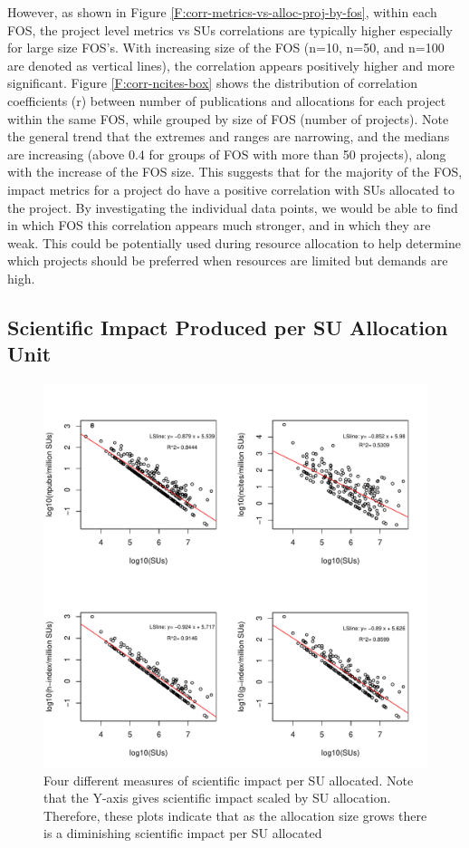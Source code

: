 \documentclass{sig-alternate}
\begin{document}
However, as shown in Figure \ref{F:corr-metrics-vs-alloc-proj-by-fos}, within each FOS, the project level metrics vs SUs correlations are typically higher especially for large size FOS's. With increasing size of the FOS (n=10, n=50, and n=100 are denoted as vertical lines), the correlation appears positively higher and more significant. Figure \ref{F:corr-ncites-box} shows the distribution of correlation coefficients (r) between number of publications and allocations for each project within the same FOS, while grouped by size of FOS (number of projects). Note the general trend that the extremes and ranges are narrowing, and the medians are increasing (above 0.4 for groups of FOS with more than 50 projects), along with the increase of the FOS size. This suggests that for the majority of the FOS, impact metrics for a project do have a positive correlation with SUs allocated to the project. By investigating the individual data points, we would be able to find in which FOS this correlation appears much stronger, and in which they are weak. This could be potentially used during resource allocation to help determine which projects should be preferred when resources are limited but demands are high.

\subsection{Scientific Impact Produced per SU Allocation Unit} 

\begin{figure}[!htb] 
  \centering 
    \includegraphics[width=1.0\columnwidth]{images/09_roi_projs.pdf} 
  \caption{Four different measures of scientific impact per SU allocated.  Note that the Y-axis gives scientific impact scaled by SU allocation. Therefore, these plots indicate that as the allocation size grows there is a diminishing scientific impact per SU allocated}\label{F:projs-roi} 
\end{figure} 
\end{document}
